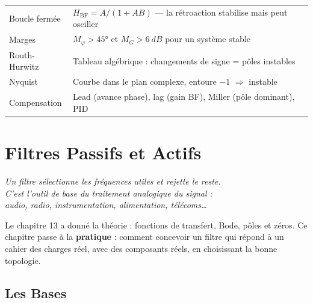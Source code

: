 \documentclass[12pt,a4paper,twoside]{book}
\begin{document}
\begin{ingenieur}[title={\color{white} Résumé --- Niveau Ingénieur}]
\begin{center}
\renewcommand{\arraystretch}{1.3}
\begin{tabular}{p{4cm}p{9cm}}
\toprule
Boucle fermée & $H_{\text{BF}} = A/(1+AB)$ --- la rétroaction stabilise mais peut osciller \\
Marges & $M_\varphi > 45°$ et $M_G > \SI{6}{dB}$ pour un système stable \\
Routh-Hurwitz & Tableau algébrique : changements de signe = pôles instables \\
Nyquist & Courbe dans le plan complexe, entoure $-1$ $\Rightarrow$ instable \\
Compensation & Lead (avance phase), lag (gain BF), Miller (pôle dominant), PID \\
\bottomrule
\end{tabular}
\end{center}
\end{ingenieur}

\chapter{Filtres Passifs et Actifs}

\begin{center}
\textit{Un filtre sélectionne les fréquences utiles et rejette le reste.\\
C'est l'outil de base du traitement analogique du signal :\\
audio, radio, instrumentation, alimentation, télécoms\ldots}
\end{center}

\vspace{0.5cm}

Le chapitre 13 a donné la théorie : fonctions de transfert, Bode, pôles et zéros. Ce chapitre passe à la \textbf{pratique} : comment concevoir un filtre qui répond à un cahier des charges réel, avec des composants réels, en choisissant la bonne topologie.

\section{Les Bases}
\end{document}
